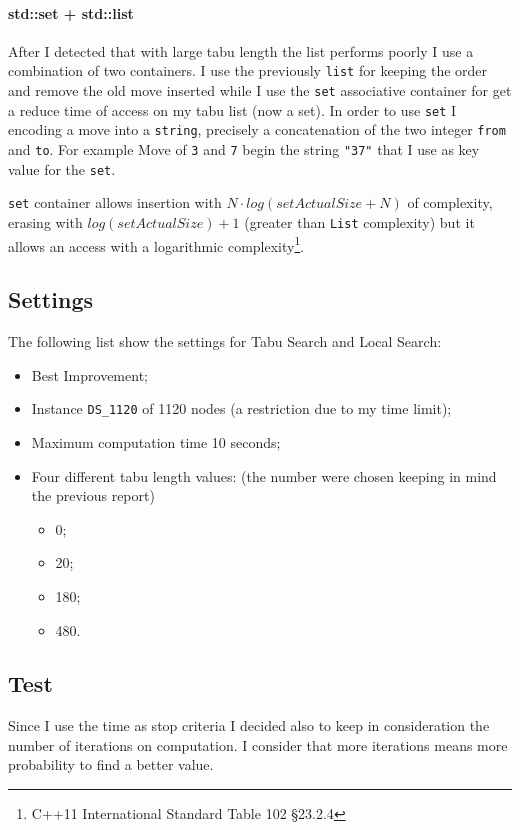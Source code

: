 		\paragraph{std::set + std::list} After I detected that with large tabu length the list performs poorly I use a combination of two containers. I use the previously \verb|list| for keeping the order and remove the old move inserted while I use the \verb|set| associative container for get a reduce time of access on my tabu list (now a set). In order to use \verb|set| I encoding a move into a \verb|string|, precisely a concatenation of the two integer \verb|from| and \verb|to|. For example Move of \verb|3| and \verb|7| begin the string \verb|"37"| that I use as key value for the \verb|set|.
		
		\verb|set| container allows insertion  with $N \cdot log (setActualSize + N)$ of complexity, erasing with $log(setActualSize) +  1$ (greater than \verb|List| complexity) but it allows an access with a logarithmic complexity\footnote{C++11 International Standard Table 102 §23.2.4}. 

\subsection{Settings}
\label{subsec:settings}
The following list show the settings for Tabu Search and Local Search:
\begin{itemize}
	\item Best Improvement;
	\item Instance \verb|DS_1120| of 1120 nodes (a restriction due to my time limit);
	\item Maximum computation time 10 seconds;
	\item Four different tabu length values: (the number were chosen keeping in mind the previous report)
	\begin{itemize}
		\item 0;
		\item 20;
		\item 180;
		\item 480.
	\end{itemize}
\end{itemize}

\subsection{Test}
	Since I use the time as stop criteria I decided also to keep in consideration the number of iterations on computation. I consider that more iterations means more probability to find a better value.
	


